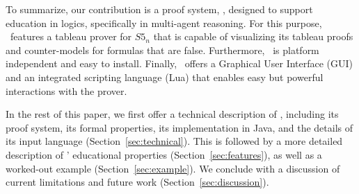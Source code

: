 To summarize, our contribution is a proof system, \oops, designed to support
education in logics, specifically in multi-agent reasoning. For this purpose,
\oops\ features a tableau prover for $S5_n$ that is capable of visualizing its
tableau proofs and counter-models for formulas that are false. Furthermore,
\oops\ is platform independent and easy to install. Finally, \oops\ offers a
Graphical User Interface (GUI) and an integrated scripting language (Lua) that
enables easy but powerful interactions with the prover.
 
In the rest of this paper, we first offer a technical description of \oops,
including its proof system, its formal properties, its implementation in Java,
and the details of its input language (Section~\ref{sec:technical}).
This is followed by a more detailed description of \oops' educational
properties (Section~\ref{sec:features}), as well as a worked-out example
(Section~\ref{sec:example}).
We conclude with a discussion of current limitations and future work
(Section~\ref{sec:discussion}).
